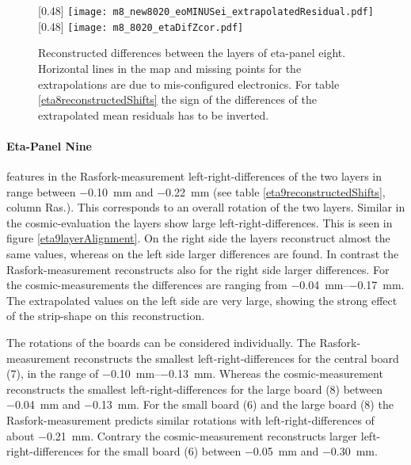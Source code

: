 \documentclass[
twoside,            %
BCOR1.4cm,          %
10pt,               %
headings=normal,    %
headsepline,        %
clearplainpage,		%
final,              %
div=14,
open=right,
bibliography=toc
]{scrreprt}
\begin{document}
\begin{figure}[!h]
	\centering
	[0.48\textwidth]
	{\texttt{[image: m8\_new8020\_eoMINUSei\_extrapolatedResidual.pdf]}}
	\hfill
	[0.48\textwidth]
	{\texttt{[image: m8\_8020\_etaDifZcor.pdf]}}
	\vspace{-3mm}
	\caption{
		Reconstructed differences between the layers of eta-panel eight.
		Horizontal lines in the map and missing points for the extrapolations are due to mis-configured electronics.
		For table \ref{eta8reconstructedShifts} the sign of the differences of the extrapolated mean residuals has to be inverted.
	}
	\label{eta8layerAlignment}
	\vspace{-5mm}	
\end{figure}

\paragraph{Eta-Panel Nine}

features in the Rasfork-measurement left-right-differences of the two layers in range between \SI{-0.10}{mm} and \SI{-0.22}{mm} (see table \ref{eta9reconstructedShifts}, column Ras.).
This corresponds to an overall rotation of the two layers.
Similar in the cosmic-evaluation the layers show large left-right-differences.
This is seen in figure \ref{eta9layerAlignment}.
On the right side the layers reconstruct almost the same values, whereas on the left side larger differences are found.
In contrast the Rasfork-measurement reconstructs also for the right side larger differences.
For the cosmic-measurements the differences are ranging from \SIrange{-0.04}{-0.17}{mm}.
The extrapolated values on the left side are very large, showing the strong effect of the strip-shape on this reconstruction. 

The rotations of the boards can be considered individually.
The Rasfork-measurement reconstructs the smallest left-right-differences for the central board (7), in the range of \SIrange{-0.10}{-0.13}{mm}.
Whereas the cosmic-measurement reconstructs the smallest left-right-differences for the large board (8) between \SI{-0.04}{mm} and \SI{-0.13}{mm}.
For the small board (6) and the large board (8) the Rasfork-measurement predicts similar rotations with left-right-differences of about \SI{-0.21}{mm}.
Contrary the cosmic-measurement reconstructs larger left-right-differences for the small board (6) between \SI{-0.05}{mm} and \SI{-0.30}{mm}.
\end{document}
